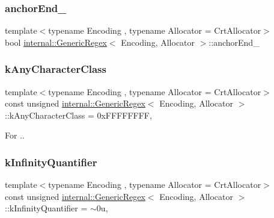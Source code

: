 \mbox{\label{classinternal_1_1GenericRegex_adbd19f8921ece1563d02e74f479d2e13}} 
\subsubsection{\texorpdfstring{anchor\+End\+\_\+}{anchorEnd\_}}
{\footnotesize\ttfamily template$<$typename Encoding , typename Allocator  = Crt\+Allocator$>$ \\
bool \hyperlink{classinternal_1_1GenericRegex}{internal\+::\+Generic\+Regex}$<$ Encoding, Allocator $>$\+::anchor\+End\+\_\+\hspace{0.3cm}{\ttfamily [private]}}

\mbox{\label{classinternal_1_1GenericRegex_a1f3b72c56d5eab221ba46a473ff611dd}} 
\subsubsection{\texorpdfstring{k\+Any\+Character\+Class}{kAnyCharacterClass}}
{\footnotesize\ttfamily template$<$typename Encoding , typename Allocator  = Crt\+Allocator$>$ \\
const unsigned \hyperlink{classinternal_1_1GenericRegex}{internal\+::\+Generic\+Regex}$<$ Encoding, Allocator $>$\+::k\+Any\+Character\+Class = 0x\+F\+F\+F\+F\+F\+F\+FF\hspace{0.3cm}{\ttfamily [static]}, {\ttfamily [private]}}



For \textquotesingle{}.\textquotesingle{}. 

\mbox{\label{classinternal_1_1GenericRegex_a12955d17d702f2fa9cf39421666c3ff3}} 
\subsubsection{\texorpdfstring{k\+Infinity\+Quantifier}{kInfinityQuantifier}}
{\footnotesize\ttfamily template$<$typename Encoding , typename Allocator  = Crt\+Allocator$>$ \\
const unsigned \hyperlink{classinternal_1_1GenericRegex}{internal\+::\+Generic\+Regex}$<$ Encoding, Allocator $>$\+::k\+Infinity\+Quantifier = $\sim$0u\hspace{0.3cm}{\ttfamily [static]}, {\ttfamily [private]}}

